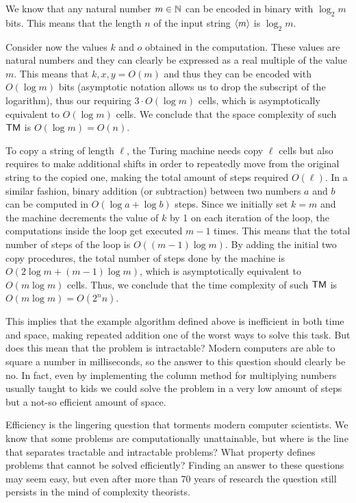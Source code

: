     We know that any natural number $m \in \mathbb{N}$ can be encoded in binary with $\log_2 m$ bits. This means that the length $n$ of the input string $\left\langle m\right\rangle$ is $\log_2 m$.
    
    Consider now the values $k$ and $o$ obtained in the computation. These values are natural numbers and they can clearly be expressed as a real multiple of the value $m$. This means that $k, x, y = O(m)$ and thus they can be encoded with $O(\log m)$ bits (asymptotic notation allows us to drop the subscript of the logarithm), thus our requiring $3 \cdot O(\log m)$ cells, which is asymptotically equivalent to $O(\log m)$ cells. We conclude that the space complexity of such $\textsf{TM}$ is $O(\log m) = O(n)$.

    \newpage

    To copy a string of length $\ell$, the Turing machine needs copy $\ell$ cells but also requires to make additional shifts in order to repeatedly move from the original string to the copied one, making the total amount of steps required $O(\ell)$. In a similar fashion, binary addition (or subtraction) between two numbers $a$ and $b$ can be computed in $O(\log a + \log b)$ steps. Since we initially set $k = m$ and the machine decrements the value of $k$ by 1 on each iteration of the loop, the computations inside the loop get executed $m-1$ times. This means that the total number of steps of the loop is $O((m-1) \log m)$. By adding the initial two copy procedures, the total number of steps done by the machine is $O(2 \log m + (m-1) \log m)$, which is asymptotically equivalent to $O(m \log m)$ cells. Thus, we conclude that the time complexity of such $\textsf{TM}$ is $O(m \log m) = O(2^n n)$.
    
    This implies that the example algorithm defined above is inefficient in both time and space, making repeated addition one of the worst ways to solve this task. But does this mean that the problem is intractable? Modern computers are able to square a number in milliseconds, so the answer to this question should clearly be no. In fact, even by implementing the column method for multiplying numbers usually taught to kids we could solve the problem in a very low amount of steps but a not-so efficient amount of space.

    
    Efficiency is the lingering question that torments modern computer scientists. We know that some problems are computationally unattainable, but where is the line that separates tractable and intractable problems? What property defines problems that cannot be solved efficiently? Finding an answer to these questions may seem easy, but even after more than 70 years of research the question still persists in the mind of complexity theorists.

\cleardoublepage